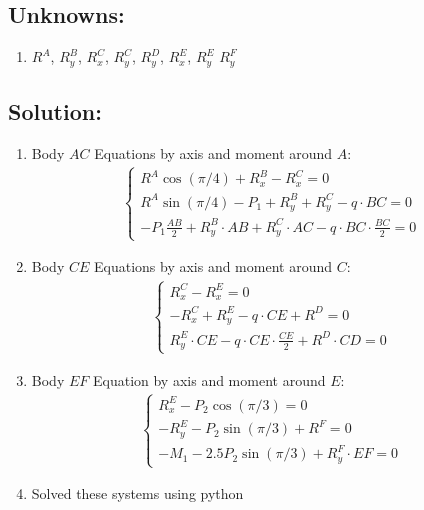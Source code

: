 \subsection*{Unknowns:}
\begin{enumerate}
    \item $R^{A}$, $R^{B}_y$, $R^{C}_x$, $R^{C}_y$, $R^{D}_y$, $R^{E}_x$, $R^{E}_y$ $R^{F}_y$
\end{enumerate}

\subsection*{Solution:}

\begin{enumerate}
    \item Body $AC$
          Equations by axis and moment around $A$:
          \begin{align}
              \begin{cases}
                  R^{A} \cos (\pi / 4)  +R^{B}_x - R^{C}_x                              = 0 \\
                  R^{A} \sin (\pi / 4) - P_1 + R^{B}_y + R^{C}_y - q \cdot BC = 0           \\
                  - P_1 \frac{AB}{2} + R^{B}_y \cdot AB + R^{C}_y \cdot AC - q \cdot BC \cdot \frac{BC}{2} = 0
              \end{cases}
          \end{align}
    \item Body $CE$
          Equations by axis and moment around $C$:
          \begin{align}
              \begin{cases}
                  R^{C}_x - R^{E}_x = 0                       \\
                  -R^{C}_x + R^{E}_y - q \cdot CE + R^{D} = 0 \\
                  R^{E}_y \cdot CE - q \cdot CE \cdot \frac{CE}{2} + R^{D} \cdot CD = 0
              \end{cases}
          \end{align}
    \item Body $EF$
          Equation by axis and moment around $E$:
          \begin{align}
              \begin{cases}
                  R^{E}_x - P_2 \cos(\pi/3) = 0          \\
                  -R^{E}_y - P_2 \sin(\pi/3) + R^{F} = 0 \\
                  - M_1 - 2.5 P_2 \sin(\pi/3) + R^{F}_y \cdot EF = 0
              \end{cases}
          \end{align}

    \item Solved these systems using python

\end{enumerate}

